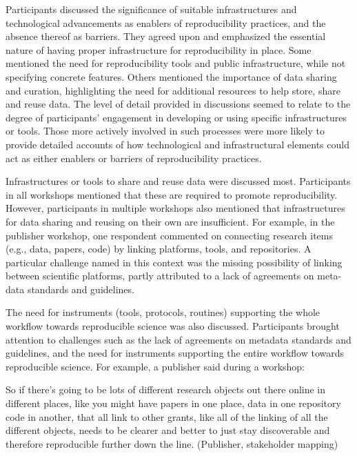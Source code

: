 \documentclass[authordate, meta]{jote-new-article}
\begin{document}
	Participants discussed the significance of suitable infrastructures and technological advancements as enablers of reproducibility practices, and the absence thereof as barriers. They agreed upon and emphasized the essential nature of having proper infrastructure for reproducibility in place. Some mentioned the need for reproducibility tools and public infrastructure, while not specifying concrete features. Others mentioned the importance of data sharing and curation, highlighting the need for additional resources to help store, share and reuse data. The level of detail provided in discussions seemed to relate to the degree of participants' engagement in developing or using specific infrastructures or tools. Those more actively involved in such processes were more likely to provide detailed accounts of how technological and infrastructural elements could act as either enablers or barriers of reproducibility practices.







	Infrastructures or tools to share and reuse data were discussed most. Participants in all workshops mentioned that these are required to promote reproducibility. However, participants in multiple workshops also mentioned that infrastructures for data sharing and reusing on their own are insufficient. For example, in the publisher workshop, one respondent commented on connecting research items (e.g., data, papers, code) by linking platforms, tools, and repositories. A particular challenge named in this context was the missing possibility of linking between scientific platforms, partly attributed to a lack of agreements on meta-data standards and guidelines.







	The need for instruments (tools, protocols, routines) supporting the whole workflow towards reproducible science was also discussed. Participants brought attention to challenges such as the lack of agreements on metadata standards and guidelines, and the need for instruments supporting the entire workflow towards reproducible science. For example, a publisher said during a workshop:







	So if there's going to be lots of different research objects out there online in different places, like you might have papers in one place, data in one repository code in another, that all link to other grants, like all of the linking of all the different objects, needs to be clearer and better to just stay discoverable and therefore reproducible further down the line. (Publisher, stakeholder mapping)
\end{document}
